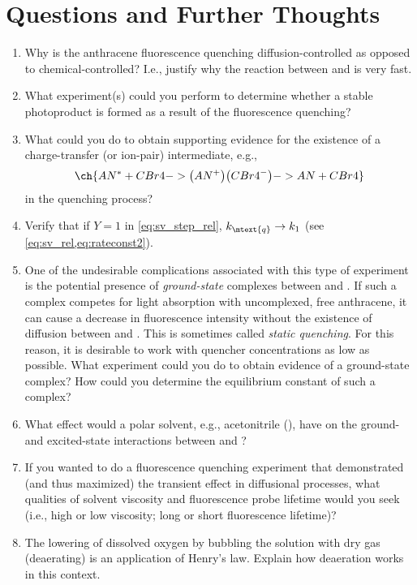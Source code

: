 \documentclass[nobib,nofonts,nols,nohyper]{tufte-handout}
\begin{document}
\section{Questions and Further Thoughts} %
\label{sec:questions_and_further_thoughts}

\begin{enumerate}
	\item Why is the anthracene fluorescence quenching diffusion-controlled as opposed to chemical-controlled? 
	I.e., justify why the reaction between  and  is very fast.
	\item What experiment(s) could you perform to determine whether a stable photoproduct is formed as a result of the fluorescence quenching?
	\item What could you do to obtain supporting evidence for the existence of a charge-transfer (or ion-pair) intermediate, e.g.,
	\[
		\ch{AN^* + CBr4 -> \big(AN^+\big)\big(CBr4^-\big) -> AN + CBr4}
	\]
	in the quenching process?
	\item Verify that if \( Y = 1 \) in \cref{eq:sv_step_rel}, \( k_\mtext{q} \rightarrow k_1 \) (see \cref{eq:sv_rel,eq:rateconst2}).
	\item One of the undesirable complications associated with this type of experiment is the potential presence of \emph{ground-state} complexes between  and . 
	If such a complex competes for light absorption with uncomplexed, free anthracene, it can cause a decrease in fluorescence intensity without the existence of diffusion between  and . 
	This is sometimes called \emph{static quenching}. 
	For this reason, it is desirable to work with quencher concentrations as low as possible. 
	What experiment could you do to obtain evidence of a ground-state complex? 
	How could you determine the equilibrium constant of such a complex?
	\item What effect would a polar solvent, e.g., acetonitrile (), have on the ground- and excited-state interactions between  and ?
	\item If you wanted to do a fluorescence quenching experiment that demonstrated (and thus maximized) the transient effect in diffusional processes, what qualities of solvent viscosity and fluorescence probe lifetime would you seek (i.e., high or low viscosity; long or short fluorescence lifetime)?
	\item The lowering of dissolved oxygen by bubbling the solution with dry  gas (deaerating) is an application of Henry's law. 
	Explain how deaeration works in this context.
\end{enumerate}
\end{document}
